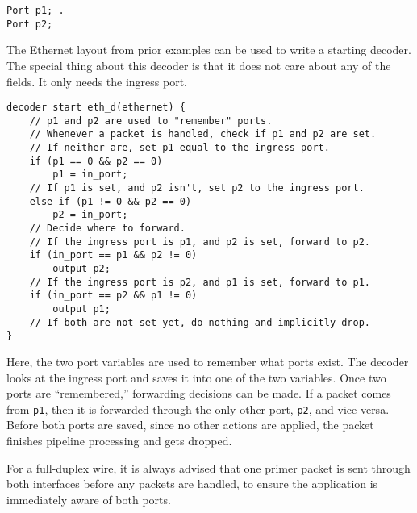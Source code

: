\begin{codepage}
\begin{lstlisting}
Port p1; .
Port p2;
\end{lstlisting}
\end{codepage}

The Ethernet layout from prior examples can be used to write a starting decoder. The
special thing about this decoder is that it does not care about any of the fields.
It only needs the ingress port.

\begin{codepage}
\begin{lstlisting}
decoder start eth_d(ethernet) {
	// p1 and p2 are used to "remember" ports.
	// Whenever a packet is handled, check if p1 and p2 are set.
	// If neither are, set p1 equal to the ingress port.
	if (p1 == 0 && p2 == 0)
		p1 = in_port;
	// If p1 is set, and p2 isn't, set p2 to the ingress port.
	else if (p1 != 0 && p2 == 0)
		p2 = in_port;
	// Decide where to forward.
	// If the ingress port is p1, and p2 is set, forward to p2.
	if (in_port == p1 && p2 != 0)
		output p2;
	// If the ingress port is p2, and p1 is set, forward to p1.
	if (in_port == p2 && p1 != 0)
		output p1;
	// If both are not set yet, do nothing and implicitly drop.
}
\end{lstlisting}
\end{codepage}

Here, the two port variables are used to remember what ports exist. The decoder
looks at the ingress port and saves it into one of the two variables. Once two
ports are ``remembered,'' forwarding decisions can be made. If a packet comes from
\texttt{p1}, then it is forwarded through the only other port, \texttt{p2}, and
vice-versa. Before both ports are saved, since no other actions are applied, the
packet finishes pipeline processing and gets dropped.

For a full-duplex wire, it is always advised that one primer packet is sent 
through both interfaces before any packets are handled, to ensure the application 
is immediately aware of both ports.